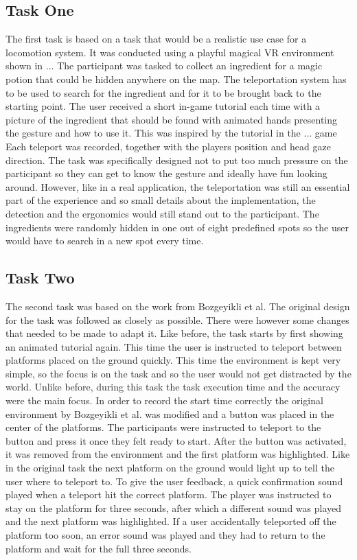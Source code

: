 \subsection{Task One}
The first task is based on a task that would be a realistic use case for a locomotion system. It was conducted using a playful magical VR environment shown in ... %
The participant was tasked to collect an ingredient for a magic potion that could be hidden anywhere on the map. The teleportation system has to be used to search for the ingredient and for it to be brought back to the starting point. The user received a short in-game tutorial each time with a picture of the ingredient that should be found with animated hands presenting the gesture and how to use it. This was inspired by the tutorial in the ... game %
Each teleport was recorded, together with the players position and head gaze direction. The task was specifically designed not to put too much pressure on the participant so they can get to know the gesture and ideally have fun looking around. However, like in a real application, the teleportation was still an essential part of the experience and so small details about the implementation, the detection and the ergonomics would still stand out to the participant. The ingredients were randomly hidden in one out of eight predefined spots so the user would have to search in a new spot every time.

\subsection{Task Two}
The second task was based on the work from Bozgeyikli et al. %
The original design for the task was followed as closely as possible. There were however some changes that needed to be made to adapt it. Like before, the task starts by first showing an animated tutorial again. This time the user is instructed to teleport between platforms placed on the ground quickly. This time the environment is kept very simple, so the focus is on the task and so the user would not get distracted by the world. Unlike before, during this task the task execution time and the accuracy were the main focus. In order to record the start time correctly the original environment by Bozgeyikli et al. was modified and a button was placed in the center of the platforms. The participants were instructed to teleport to the button and press it once they felt ready to start. After the button was activated, it was removed from the environment and the first platform was highlighted. Like in the original task the next platform on the ground would light up to tell the user where to teleport to. To give the user feedback, a quick confirmation sound played when a teleport hit the correct platform. The player was instructed to stay on the platform for three seconds, after which a different sound was played and the next platform was highlighted. If a user accidentally teleported off the platform too soon, an error sound was played and they had to return to the platform and wait for the full three seconds. 

